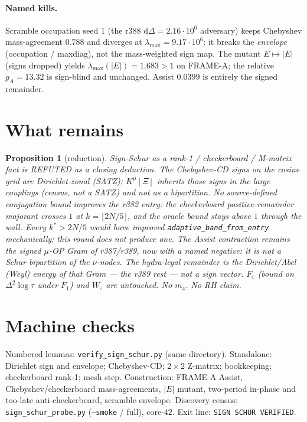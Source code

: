 \documentclass[11pt]{article}
\newtheorem{prop}{Proposition}
\theoremstyle{remark}
\begin{document}
\paragraph{Named kills.}
Scramble occupation seed $1$ (the r388 $\mathrm{d}\Delta=2.16\cdot10^6$
adversary) keeps Chebyshev mass-agreement $0.788$ and diverges
at $\lambda_{\max}=9.17\cdot10^6$: it breaks the
\emph{envelope} (occupation / maxdiag), not the mass-weighted
sign map.
The mutant $E\mapsto\lvert E\rvert$ (signs dropped) yields
$\lambda_{\max}(\lvert E\rvert)=1.683>1$ on FRAME-A; the
relative $g_A=13.32$ is sign-blind and unchanged.
Assist $0.0399$ is entirely the signed remainder.

\section{What remains}\label{sec:rest}

\begin{prop}[reduction]\label{prop:red}
Sign-Schur as a rank-1 / checkerboard / M-matrix fact is
REFUTED as a closing deduction.
The Chebyshev-CD signs on the cosine grid are Dirichlet-zonal
(SATZ); $K^\mu[\Xi]$ inherits those signs in the large
couplings (census, not a SATZ) and not as a bipartition.
No source-defined conjugation bound improves the r382 entry:
the checkerboard positive-remainder majorant crosses $1$ at
$k=\lfloor 2N/5\rfloor$, and the oracle bound stays above $1$
through the wall.
Every $k^*>2N/5$ would have improved
\texttt{adaptive\_band\_from\_entry} mechanically; this round
does not produce one.
The Assist contraction remains the signed $\mu$-OP Gram of
r387/r389, now with a named negative: it is \emph{not} a Schur
bipartition of the $\nu$-nodes.
The hydra-legal remainder is the Dirichlet/Abel (Weyl) energy
of that Gram --- the r389 rest --- not a sign vector.
$F_\varepsilon$ (bound on $\Delta^2\log\tau$ under $F_1$) and
$W_\varepsilon$ are untouched.
No $m_4$.  No RH claim.
\end{prop}

\section{Machine checks}\label{sec:machine}

Numbered lemmas: \texttt{verify\_sign\_schur.py} (same
directory).
Standalone: Dirichlet sign and envelope; Chebyshev-CD;
$2\times 2$ Z-matrix; bookkeeping; checkerboard rank-1;
mesh step.
Construction: FRAME-A Assist, Chebyshev/checkerboard
mass-agreements, $\lvert E\rvert$ mutant, two-period in-phase
and too-late anti-checkerboard, scramble envelope.
Discovery census: \texttt{sign\_schur\_probe.py}
(\texttt{--smoke} / full), core-$42$.
Exit line: \texttt{SIGN SCHUR VERIFIED}.
\end{document}
